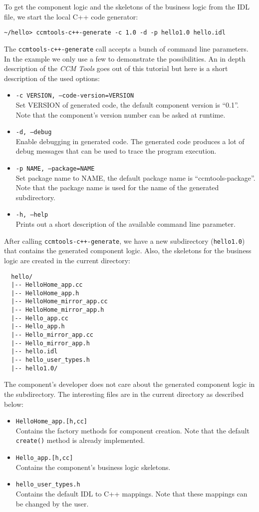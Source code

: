 To get the component logic and the skeletons of the business logic from the IDL file, 
we start the local C++ code generator:
\begin{verbatim}
~/hello> ccmtools-c++-generate -c 1.0 -d -p hello1.0 hello.idl
\end{verbatim}
The {\tt ccmtools-c++-generate} call accepts a bunch of command line parameters. In the
example we only use a few to demonstrate the possibilities.
An in depth description of the {\it CCM Tools} goes out of this tutorial but 
here is a short description of the used options:
\begin{itemize}
\item {\tt -c VERSION, --code-version=VERSION }\\
Set VERSION of generated code, the default component version is ``0.1''.
Note that the component's version number can be asked at runtime.  

\item {\tt -d, --debug }\\
Enable debugging in generated code. The generated code produces a lot of
debug messages that can be used to trace the program execution.

\item {\tt -p NAME, --package=NAME}\\
Set package name to NAME, the default package name is ``ccmtools-package''.
Note that the package name is used for the name of the generated subdirectory.

\item {\tt -h, --help}\\
Prints out a short description of the available command line parameter.
\end{itemize}
After calling {\tt ccmtools-c++-generate}, we have a new subdirectory ({\tt hello1.0}) that 
contains the generated component logic. Also, the skeletons for the business logic are
created in the current directory:
\begin{verbatim}
  hello/
  |-- HelloHome_app.cc
  |-- HelloHome_app.h
  |-- HelloHome_mirror_app.cc
  |-- HelloHome_mirror_app.h
  |-- Hello_app.cc
  |-- Hello_app.h
  |-- Hello_mirror_app.cc
  |-- Hello_mirror_app.h
  |-- hello.idl
  |-- hello_user_types.h
  |-- hello1.0/
\end{verbatim}
The component's developer does not care about the generated component logic in the
subdirectory. The interesting files are in the current directory as described below:
\begin{itemize}
\item {\tt HelloHome\_app.[h,cc]} \\
Contains the factory methods for component creation. 
Note that the default {\tt create()} method is already implemented.
\item {\tt Hello\_app.[h,cc]} \\
Contains the component's business logic skeletons.
\item {\tt hello\_user\_types.h} \\
Contains the default IDL to C++ mappings. Note that these mappings can be 
changed by the user.
\end{itemize}
